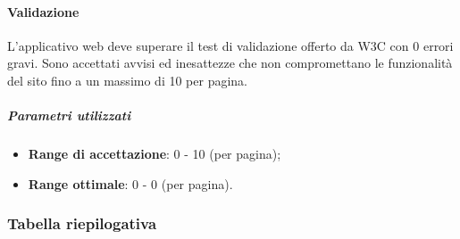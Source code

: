 \documentclass[../PianoDiQualifica.tex]{subfiles}
\begin{document}
				\paragraph{Validazione \\}
					L'applicativo web deve superare il test di validazione offerto da
					W3C con 0 errori gravi.
					Sono accettati avvisi ed inesattezze che non compromettano le
					funzionalità del sito fino a un massimo di 10 per pagina.
					\subparagraph{Parametri utilizzati}
						\begin{itemize}
							\item \textbf{Range di accettazione}: 0 - 10 (per pagina);
							\item \textbf{Range ottimale}: 0 - 0 (per pagina).
						\end{itemize}
			\subsubsection{Tabella riepilogativa}
\end{document}
